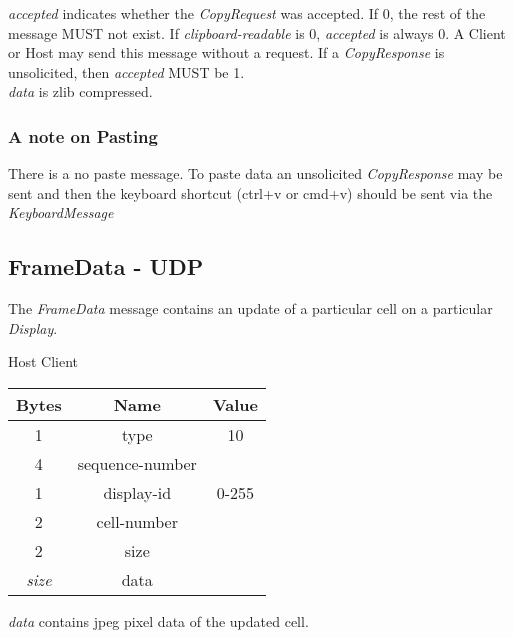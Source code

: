 \documentclass{article}
\begin{document}
    \emph{accepted} indicates whether the \emph{CopyRequest} was accepted. If 0, the rest of the message MUST not exist.
    If \emph{clipboard-readable} is 0, \emph{accepted} is always 0. A Client or Host may send this message without a
    request.
    If a \emph{CopyResponse} is unsolicited, then \emph{accepted} MUST be 1.\\

    \emph{data} is zlib compressed.

    \subsubsection{A note on Pasting}

    There is a no paste message. To paste data an unsolicited \emph{CopyResponse} may be sent and then the keyboard
    shortcut (ctrl+v or cmd+v) should be sent via the \emph{KeyboardMessage}

    \subsection{FrameData - UDP}
    The \emph{FrameData} message contains an update of a particular cell on a particular \emph{Display}.

    \begin{center}
        Host \textrightarrow Client\\
        \begin{tabular}{|c|c|c|}
            \hline
            \textbf{Bytes} & \textbf{Name}   & \textbf{Value} \\
            \hline
            1              & type            & 10             \\
            \hline
            4              & sequence-number &                \\
            \hline
            1              & display-id      & 0-255          \\
            \hline
            2              & cell-number     &                \\
            \hline
            2              & size            &                \\
            \hline
            \emph{size}    & data            &                \\
            \hline
        \end{tabular}
    \end{center}

    \emph{data} contains jpeg pixel data of the updated cell.
\end{document}
